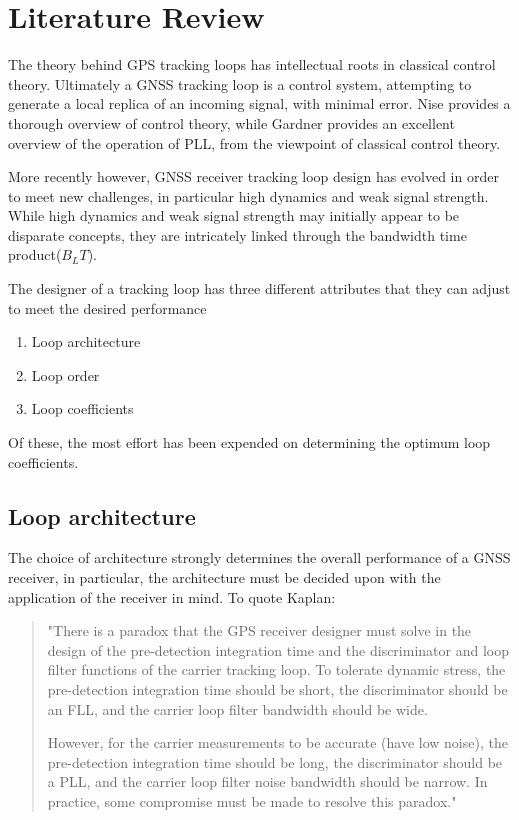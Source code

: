 \chapter{Literature Review}\label{ch:LitReview}

The theory behind GPS tracking loops has intellectual roots in classical control theory. Ultimately a \ac{GNSS} tracking loop is a control system, attempting to generate a local replica of an incoming signal, with minimal error. Nise \cite{Nise} provides a thorough overview of control theory, while Gardner \cite{Gardner} provides an excellent overview of the operation of PLL, from the viewpoint of classical control theory.  

More recently however, GNSS receiver tracking loop design has evolved in order to meet new challenges, in particular high dynamics and weak signal strength. While high dynamics and weak signal strength may initially appear to be disparate concepts, they are intricately linked through the bandwidth time product($B_LT$). 

The designer of a tracking loop has three different attributes that they can adjust to meet the desired performance 
\begin{enumerate}
\item{Loop architecture}
\item{Loop order}
\item{Loop coefficients}
\end{enumerate}

Of these, the most effort has been expended on determining the optimum loop coefficients. 

\section{Loop architecture}

The choice of architecture strongly determines the overall performance of a \ac{GNSS} receiver, in particular, the architecture must be decided upon with the application of the receiver in mind. To quote Kaplan: 
\begin{quotation}
"There is a paradox that the GPS receiver designer must solve in the design of the pre-detection integration time and the discriminator and loop filter functions of the carrier tracking loop. To tolerate dynamic stress, the pre-detection integration time should be short, the discriminator should be an \ac{FLL}, and the carrier loop filter bandwidth should be wide.

However, for the carrier measurements to be accurate (have low noise), the pre-detection integration time should be long, the discriminator should be a \ac{PLL}, and the carrier loop filter noise bandwidth should be narrow. In practice, some compromise must be made to resolve this paradox."\cite{Kaplan}
\end{quotation}


